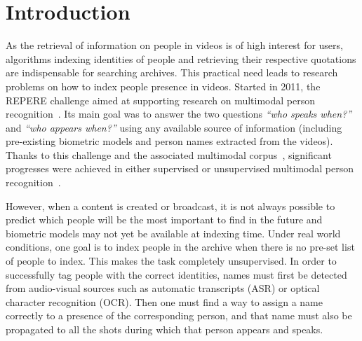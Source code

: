 \section{Introduction}

As the retrieval of information on people in videos is of high interest for users, algorithms indexing identities of people and retrieving their respective quotations are indispensable for searching archives. This practical need leads to research problems on how to index people presence in videos.
%
%
%
Started in 2011, the REPERE challenge aimed at supporting research on multimodal person recognition~\cite{BERNARD--SLAM--2013, GIRAUDEL--LREC--2012}. Its main goal was to answer the two questions \emph{``who speaks when?''} and \emph{``who appears when?''} using any available source of information (including pre-existing biometric models and person names extracted from the videos).
%
Thanks to this challenge and the associated multimodal corpus~\cite{GIRAUDEL--LREC--2012}, significant progresses were achieved in either supervised or unsupervised multimodal person recognition~\cite{BECHET--INTERSPEECH--2014, BREDIN--IJMIR--2014, GAY--CBMI--2014, poignant2012fusion, ROUVIER--CBMI--2014}.

However, when a content is created or broadcast, it is not always possible to predict which people will be the most important to find in the future and biometric models may not yet be available at indexing time.
%
Under real world conditions, one  goal is to index people in the archive when there is no pre-set list of people to index.
%
This makes the task completely unsupervised.
%
In order to successfully tag people with the correct identities, names must first be detected from audio-visual sources such as automatic transcripts (ASR) or optical character recognition (OCR).
%
Then one must find a way to assign a name correctly to a presence of the corresponding person, and that name must also be propagated to all the shots during which that person appears and speaks. 
%


